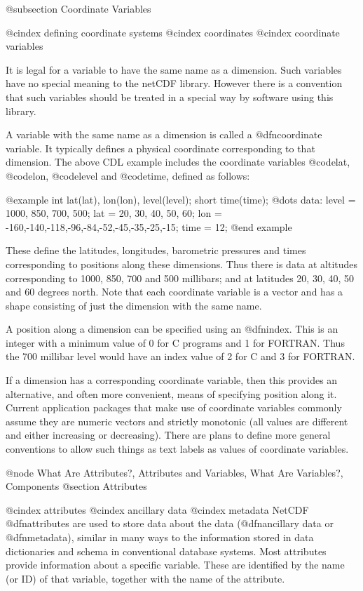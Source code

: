 @subsection Coordinate Variables

@cindex defining coordinate systems
@cindex coordinates
@cindex coordinate variables

It is legal for a variable to have the same name as a dimension.
Such variables have no special meaning to the netCDF library.
However there is a convention that such variables should be treated in
a special way by software using this library.

A variable with the same name as a dimension is called a @dfn{coordinate
variable}.
It typically defines a physical coordinate corresponding to that dimension.
The above CDL example includes the coordinate variables @code{lat}, @code{lon},
@code{level} and @code{time}, defined as follows:

@example
        int     lat(lat), lon(lon), level(level);
        short   time(time);
  @dots{}
data:
        level   = 1000, 850, 700, 500;
        lat     = 20, 30, 40, 50, 60;
        lon     = -160,-140,-118,-96,-84,-52,-45,-35,-25,-15;
        time    = 12;
@end example

These define the latitudes, longitudes, barometric pressures and times
corresponding to positions along these dimensions.
Thus there is data at altitudes corresponding to
1000, 850, 700 and 500 millibars; and at latitudes 20, 30, 40, 50 and  60
degrees north.
Note that each coordinate variable is a vector and has a shape consisting
of just the dimension with the same name.

A position along a dimension can be specified using an @dfn{index}.
This is an integer with a minimum value of 0 for C programs and 1 for
FORTRAN.
Thus the 700 millibar level would have an index value of 2 for C and 3 for
FORTRAN.

If a dimension has a corresponding coordinate variable, then this
provides an alternative, and often more convenient, means of specifying
position along it.
Current application
packages that make use of coordinate variables
commonly assume they are numeric vectors and strictly monotonic (all values
are different and either increasing or decreasing).
There are plans to define more general conventions to allow such things
as text labels as values of coordinate variables.

@node What Are Attributes?, Attributes and Variables, What Are Variables?, Components
@section Attributes

@cindex attributes
@cindex ancillary data
@cindex metadata
NetCDF @dfn{attributes} are used to store data about the data
(@dfn{ancillary data} or @dfn{metadata}), similar in many ways
to the information
stored in data dictionaries and schema in conventional database systems.
Most attributes provide information about a specific variable.
These are
identified by the name (or ID) of that variable, together with the name
of the attribute.

